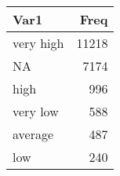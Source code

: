 
\begin{tabular}[t]{lr}
\toprule
Var1 & Freq\\
\midrule
very high & 11218\\
NA & 7174\\
high & 996\\
very low & 588\\
average & 487\\
\addlinespace
low & 240\\
\bottomrule
\end{tabular}